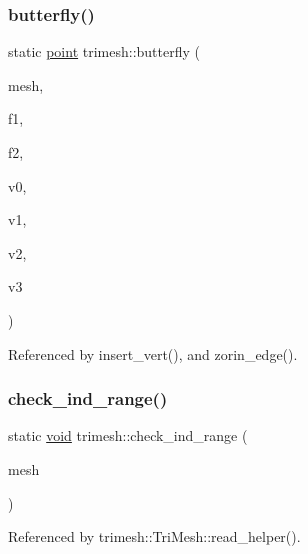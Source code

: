 \subsubsection{\texorpdfstring{butterfly()}{butterfly()}}
{\footnotesize\ttfamily static \hyperlink{namespacetrimesh_a325b99fd6454b22fa4c4bc3223271b2c}{point} trimesh\+::butterfly (\begin{DoxyParamCaption}\item[{\hyperlink{classtrimesh_1_1TriMesh}{Tri\+Mesh} $\ast$}]{mesh,  }\item[{int}]{f1,  }\item[{int}]{f2,  }\item[{int}]{v0,  }\item[{int}]{v1,  }\item[{int}]{v2,  }\item[{int}]{v3 }\end{DoxyParamCaption})\hspace{0.3cm}{\ttfamily [static]}}



Referenced by insert\+\_\+vert(), and zorin\+\_\+edge().

\mbox{\label{namespacetrimesh_af0288945772cf791e1beebe16991053d}} 
\subsubsection{\texorpdfstring{check\+\_\+ind\+\_\+range()}{check\_ind\_range()}}
{\footnotesize\ttfamily static \hyperlink{namespacetrimesh_a784ddfd979e1c579bda795a8edfc3f43}{void} trimesh\+::check\+\_\+ind\+\_\+range (\begin{DoxyParamCaption}\item[{\hyperlink{classtrimesh_1_1TriMesh}{Tri\+Mesh} $\ast$}]{mesh }\end{DoxyParamCaption})\hspace{0.3cm}{\ttfamily [static]}}



Referenced by trimesh\+::\+Tri\+Mesh\+::read\+\_\+helper().

\mbox{\label{namespacetrimesh_a70949984d4d6e81587f382b93aba479a}} 
